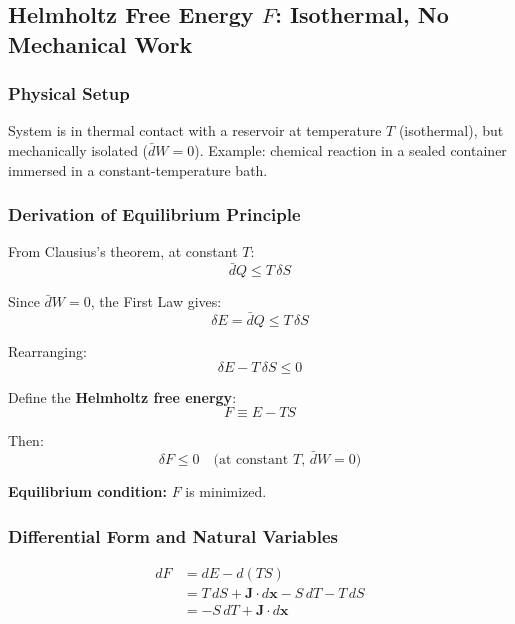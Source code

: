 \documentclass[9pt,twocoloumn]{article}
\begin{document}
\subsection{Helmholtz Free Energy $F$: Isothermal, No Mechanical Work}

\subsubsection{Physical Setup}
System is in thermal contact with a reservoir at temperature $T$ (isothermal), but mechanically isolated ($\bar{d}W = 0$). Example: chemical reaction in a sealed container immersed in a constant-temperature bath.

\subsubsection{Derivation of Equilibrium Principle}

From Clausius's theorem, at constant $T$:
\begin{equation}
\bar{d}Q \leq T \, \delta S
\end{equation}

Since $\bar{d}W = 0$, the First Law gives:
\begin{equation}
\delta E = \bar{d}Q \leq T \, \delta S
\end{equation}

Rearranging:
\begin{equation}
\delta E - T \, \delta S \leq 0
\end{equation}

Define the \textbf{Helmholtz free energy}:
\begin{equation}
\boxed{F \equiv E - TS}
\end{equation}

Then:
\begin{equation}
\boxed{\delta F \leq 0 \quad \text{(at constant } T \text{, } \bar{d}W = 0 \text{)}}
\end{equation}

\textbf{Equilibrium condition:} $F$ is minimized.

\subsubsection{Differential Form and Natural Variables}

\begin{align}
dF &= dE - d(TS) \\
&= T \, dS + \mathbf{J} \cdot d\mathbf{x} - S \, dT - T \, dS \\
&= -S \, dT + \mathbf{J} \cdot d\mathbf{x}
\end{align}
\end{document}

